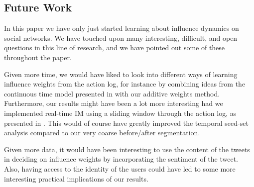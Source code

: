 \documentclass[sigconf]{acmart}
\begin{document}
\subsection{Future Work}

In this paper we have only just started learning about influence dynamics on social networks. We have touched upon many interesting, difficult, and open questions in this line of research, and we have pointed out some of these throughout the paper. 

Given more time, we would have liked to look into different ways of learning influence weights from the action log, for instance by combining ideas from the continuous time model presented in \cite{goyal2010learning} with our additive weights method. Furthermore, our results might have been a lot more interesting had we implemented real-time IM using a sliding window through the action log, as presented in \cite{wang2017real}. This would of course have greatly improved the temporal seed-set analysis compared to our very coarse before/after segmentation.

Given more data, it would have been interesting to use the content of the tweets in deciding on influence weights by incorporating the sentiment of the tweet. Also, having access to the identity of the users could have led to some more interesting practical implications of our results. 


\nocite{*}


\end{document}
